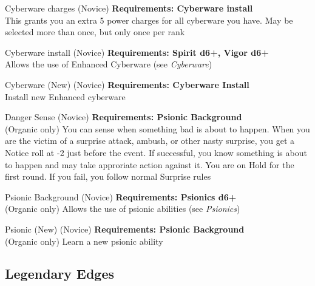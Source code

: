 \begin{multicols}{2}
\begin{genericsection}{Cyberware charges (Novice)}
\textbf{Requirements: Cyberware install}\\
This grants you an extra 5 power charges for all cyberware you have. May be selected more than once, but only once per rank
\end{genericsection}

\begin{genericsection}{Cyberware install (Novice)}
\textbf{Requirements: Spirit d6+, Vigor d6+}\\
Allows the use of Enhanced Cyberware (see \textit{Cyberware})
\end{genericsection}

\begin{genericsection}{Cyberware (New) (Novice)}
\textbf{Requirements: Cyberware Install}\\
Install new Enhanced cyberware
\end{genericsection}

\begin{genericsection}{Danger Sense (Novice)}
\textbf{Requirements: Psionic Background}\\
(Organic only) You can sense when something bad is about to happen. When you are the victim of a surprise attack, ambush, or other nasty surprise, you get a Notice roll at -2 just before the event. If successful, you know something is about to happen and may take approriate action against it. You are on Hold for the first round. If you fail, you follow normal Surprise rules
\end{genericsection}

\begin{genericsection}{Psionic Background (Novice)}
\textbf{Requirements: Psionics d6+}\\
(Organic only) Allows the use of psionic abilities (see \textit{Psionics})
\end{genericsection}

\begin{genericsection}{Psionic (New) (Novice)}
\textbf{Requirements: Psionic Background}\\
(Organic only) Learn a new psionic ability
\end{genericsection}

%
%
\subsection{Legendary Edges}


\end{multicols}
